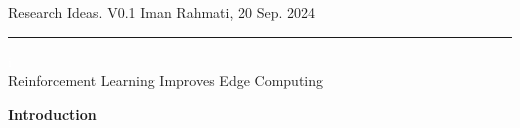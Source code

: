 \documentclass[12pt]{article}
\newcommand{\soptitle}{Reinforcement Learning Improves Edge Computing}
\newcommand{\yourname}{Iman Rahmati}
\begin{document}
	

	
%


\begin{center} 
	
		\vspace{-17mm}
	
	\large Research Ideas. V0.1   \hfill Iman Rahmati, 20 Sep. 2024 \vspace{1mm} \hrule
	
	\vspace{-1mm}
	
	\textcolor{white}{i} \\ \LARGE\soptitle \vspace{6mm}\\
\end{center}
	



\vspace{-8mm}

\begin{abstract}
	\vspace{-2mm}
	\noindent
	Mobile edge computing often suffers from the dynamic and unknown nature of the environment such as time-varying conditions, heterogeneous devices, and frequent communication requests, imposing significant challenges on improving system performance. To meet the rapidly growing demands of computation-intensive and time-sensitive applications, Reinforcement learning \cite{mnih2015human} has been proposed as an effective tool to establish low-latency and energy-efficient networks. RL enables network entities to interact with the environment and learn an optimal decision-making policy, usually modeled as a Markov decision process \cite{puterman2014markov}.
\end{abstract}



	
\vspace{4mm}

\noindent\large\textbf{Introduction}

\vspace{1.5mm}
\normalsize
\end{document}
